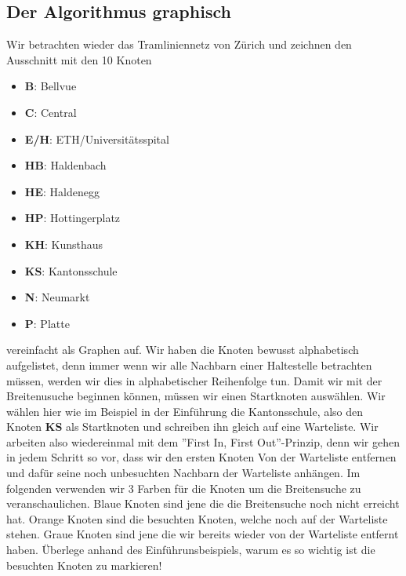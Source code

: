\subsection{Der Algorithmus graphisch}
Wir betrachten wieder das Tramliniennetz von Zürich und zeichnen den Ausschnitt mit den 10 Knoten
\begin{multicols}{2}
\begin{itemize}
    \item {\bf{B}}: Bellvue
    \item {\bf{C}}: Central
    \item {\bf{E/H}}: ETH/Universitätsspital
    \item {\bf{HB}}: Haldenbach
    \item {\bf{HE}}: Haldenegg
    \item {\bf{HP}}: Hottingerplatz
    \item {\bf{KH}}: Kunsthaus
    \item {\bf{KS}}: Kantonsschule
    \item {\bf{N}}: Neumarkt
    \item {\bf{P}}: Platte

\end{itemize}
\end{multicols}
\noindent vereinfacht als Graphen auf. Wir haben die Knoten bewusst alphabetisch aufgelistet, denn immer wenn wir alle Nachbarn einer Haltestelle betrachten müssen, werden wir dies in alphabetischer Reihenfolge tun. 
Damit wir mit der Breitenusuche beginnen können, müssen wir einen Startknoten auswählen. Wir wählen hier wie im Beispiel in der Einführung die Kantonsschule, also den Knoten {\bf{KS}} als Startknoten und schreiben ihn gleich auf eine Warteliste. Wir arbeiten also wiedereinmal mit dem ''First In, First Out''-Prinzip, denn wir gehen in jedem Schritt so vor, dass wir den ersten Knoten Von der Warteliste entfernen und dafür seine noch unbesuchten Nachbarn der Warteliste anhängen. Im folgenden verwenden wir 3 Farben für die Knoten um die Breitensuche zu veranschaulichen. Blaue Knoten sind jene die die Breitensuche noch nicht erreicht hat. Orange Knoten sind die besuchten Knoten, welche noch auf der Warteliste stehen. Graue Knoten sind jene die wir bereits wieder von der Warteliste entfernt haben. Überlege anhand des Einführunsbeispiels, warum es so wichtig ist die besuchten Knoten zu markieren!

